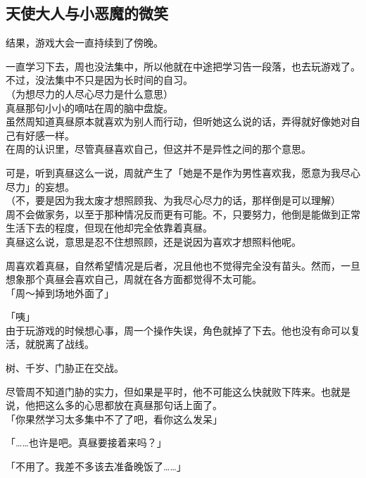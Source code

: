 \subsection{天使大人与小恶魔的微笑}

结果，游戏大会一直持续到了傍晚。

一直学习下去，周也没法集中，所以他就在中途把学习告一段落，也去玩游戏了。不过，没法集中不只是因为长时间的自习。\\

（为想尽力的人尽心尽力是什么意思）\\

真昼那句小小的嘀咕在周的脑中盘旋。\\

虽然周知道真昼原本就喜欢为别人而行动，但听她这么说的话，弄得就好像她对自己有好感一样。\\

在周的认识里，尽管真昼喜欢自己，但这并不是异性之间的那个意思。

可是，听到真昼这么一说，周就产生了「她是不是作为男性喜欢我，愿意为我尽心尽力」的妄想。\\

（不，要是因为我太废才想照顾我、为我尽心尽力的话，那样倒是可以理解）\\

周不会做家务，以至于那种情况反而更有可能。不，只要努力，他倒是能做到正常生活下去的程度，但现在他却完全依靠着真昼。\\

真昼这么说，意思是忍不住想照顾，还是说因为喜欢才想照料他呢。

周喜欢着真昼，自然希望情况是后者，况且他也不觉得完全没有苗头。然而，一旦想象那个真昼会喜欢自己，周就在各方面都觉得不太可能。\\

「周～掉到场地外面了」

「咦」\\

由于玩游戏的时候想心事，周一个操作失误，角色就掉了下去。他也没有命可以复活，就脱离了战线。

树、千岁、门胁正在交战。

尽管周不知道门胁的实力，但如果是平时，他不可能这么快就败下阵来。也就是说，他把这么多的心思都放在真昼那句话上面了。\\

「你果然学习太多集中不了了吧，看你这么发呆」

「……也许是吧。真昼要接着来吗？」

「不用了。我差不多该去准备晚饭了……」\\

